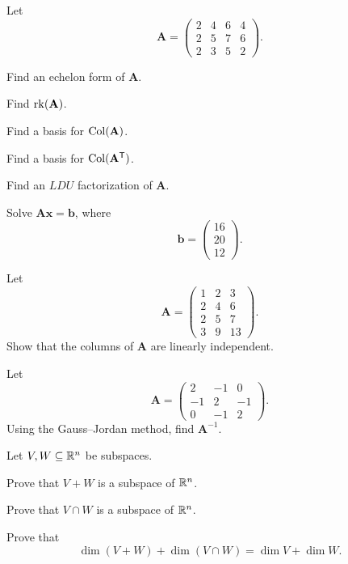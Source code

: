 \documentclass[11pt,oneside]{article}
\begin{document}
\begin{problem}
Let
\[
\mathbf A=
\begin{pmatrix}
2&4&6&4\\
2&5&7&6\\
2&3&5&2
\end{pmatrix}.
\]
\begin{problemsubparts}
\item Find an echelon form of $\mathbf A$.
\item Find $\operatorname{rk}(\mathbf A)$.
\item Find a basis for $\operatorname{Col}(\mathbf A)$.
\item Find a basis for $\operatorname{Col}(\mathbf A^{\mathsf T})$.
\item Find an $LDU$ factorization of $\mathbf A$.
\item Solve $\mathbf A\mathbf x=\mathbf b$, where
\[
\mathbf b=
\begin{pmatrix}
16\\20\\12
\end{pmatrix}.
\]
\end{problemsubparts}
\end{problem}

\begin{problem}
Let
\[
\mathbf A=
\begin{pmatrix}
1&2&3\\
2&4&6\\
2&5&7\\
3&9&13
\end{pmatrix}.
\]
Show that the columns of $\mathbf A$ are linearly independent.
\end{problem}

\begin{problem}
Let
\[
\mathbf A=
\begin{pmatrix}
2&-1&0\\
-1&2&-1\\
0&-1&2
\end{pmatrix}.
\]
Using the Gauss--Jordan method, find $\mathbf A^{-1}$.
\end{problem}

\begin{problem}
Let $V,W\subseteq\mathbb{R}^n$ be subspaces.
\begin{problemsubparts}
\item Prove that $V+W$ is a subspace of $\mathbb{R}^n$.
\item Prove that $V\cap W$ is a subspace of $\mathbb{R}^n$.
\item Prove that
\[
\dim(V+W)+\dim(V\cap W)=\dim V+\dim W.
\]
\end{problemsubparts}
\end{problem}
\end{document}
